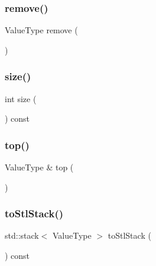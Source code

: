 \mbox{\label{classStack_a025ec97fa5b04552f5ad0902c1f02ac1}} 
\subsubsection{\texorpdfstring{remove()}{remove()}}
{\footnotesize\ttfamily Value\+Type remove (\begin{DoxyParamCaption}{ }\end{DoxyParamCaption})}

\mbox{\label{classStack_af9593d4a5ff4274efaf429cb4f9e57cc}} 
\subsubsection{\texorpdfstring{size()}{size()}}
{\footnotesize\ttfamily int size (\begin{DoxyParamCaption}{ }\end{DoxyParamCaption}) const}

\mbox{\label{classStack_af4e7b293e5989a3737c116dbf8f4eaf2}} 
\subsubsection{\texorpdfstring{top()}{top()}}
{\footnotesize\ttfamily Value\+Type \& top (\begin{DoxyParamCaption}{ }\end{DoxyParamCaption})}

\mbox{\label{classStack_a3a9d23b9230220abe769aa0ee5972498}} 
\subsubsection{\texorpdfstring{to\+Stl\+Stack()}{toStlStack()}}
{\footnotesize\ttfamily std\+::stack$<$ Value\+Type $>$ to\+Stl\+Stack (\begin{DoxyParamCaption}{ }\end{DoxyParamCaption}) const}

\mbox{\label{classStack_a1fe5121d6528fdea3f243321b3fa3a49}} 
